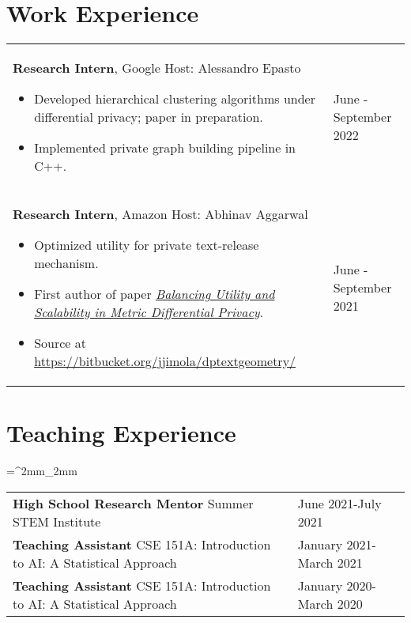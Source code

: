 \documentclass[11pt]{article}
\begin{document}
\section*{Work Experience}
\begin{tabu}{X[4, l] X[1, l]}
	\textbf{Research Intern}, Google \newline
	Host: Alessandro Epasto
	\begin{itemize}
	\setlength\itemsep{-0.3em}
	\item Developed hierarchical clustering algorithms under differential privacy; paper in preparation.
	\item Implemented private graph building pipeline in C++.
	\end{itemize}
&
	June - September 2022 \\
	\textbf{Research Intern}, Amazon \newline
	Host: Abhinav Aggarwal 
	\begin{itemize}
		\setlength\itemsep{-0.3em}
		\item Optimized utility for private text-release mechanism.
		\item First author of paper \textit{\href{https://openreview.net/pdf?id=B0l8-wLjql5}{Balancing Utility and Scalability in Metric Differential Privacy}}. 
		\item Source at \href{https://bitbucket.org/jjimola/dptextgeometry/}{https://bitbucket.org/jjimola/dptextgeometry/}
	\end{itemize}
&
	June - September 2021 \\
\end{tabu}

\section*{Teaching Experience}
\tabulinesep=^2mm_2mm
\begin{tabu}{X[4,l] X[1,l]}
  \textbf{High School Research Mentor} \newline
    Summer STEM Institute 
  & June 2021-July 2021 \\
	\textbf{Teaching Assistant} \newline
    CSE 151A: Introduction to AI: A Statistical Approach 
  & January 2021-March 2021 \\
  \textbf{Teaching Assistant} \newline
    CSE 151A: Introduction to AI: A Statistical Approach 
  & January 2020-March 2020 \\
\end{tabu}
\end{document}

